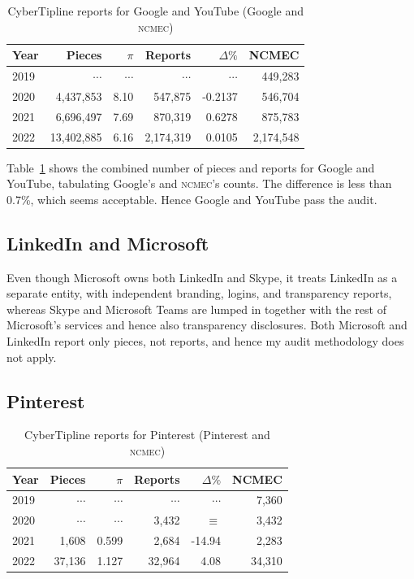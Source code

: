 \documentclass[nonacm,screen]{acmart}
\newcommand\V[1]{\textsc{\MakeLowercase{#1}}}
\begin{document}
\begin{table}[h!]
\centering\libertineLF
\caption{CyberTipline reports for Google and YouTube (Google and \V{NCMEC})}
\label{tab:alphabet}
\begin{tabular}{l|rr|rrr}
\textbf{Year}
& \textbf{Pieces} & \textbf{$\pi$} & \textbf{Reports}
& \textbf{$\Delta\%$} & \textbf{NCMEC} \\ \hline
2019 & $\cdots$ & $\cdots$ & $\cdots$ & $\cdots$ & 449,283 \\
2020 & 4,437,853 & 8.10 & 547,875 & -0.2137 & 546,704 \\
2021 & 6,696,497 & 7.69 & 870,319 & 0.6278 & 875,783 \\
2022 & 13,402,885 & 6.16 & 2,174,319 & 0.0105 & 2,174,548 \\
\end{tabular}
\end{table}

\noindent{}Table~\ref{tab:alphabet} shows the combined number of pieces and
reports for Google and YouTube, tabulating Google's and \V{NCMEC}'s counts. The
difference is less than 0.7\%, which seems acceptable. Hence Google and YouTube
pass the audit.


\subsection{LinkedIn and Microsoft}

\noindent{}Even though Microsoft owns both LinkedIn and Skype, it treats
LinkedIn as a separate entity, with independent branding, logins, and
transparency reports, whereas Skype and Microsoft Teams are lumped in together
with the rest of Microsoft's services and hence also transparency disclosures.
Both Microsoft and LinkedIn report only pieces, not reports, and hence my audit
methodology does not apply.


\subsection{Pinterest}

\begin{table}[h!]
\centering\libertineLF
\caption{CyberTipline reports for Pinterest (Pinterest and \V{NCMEC})}
\label{tab:pinterest}
\begin{tabular}{l|rr|rrr}
\textbf{Year}
& \textbf{Pieces} & \textbf{$\pi$} & \textbf{Reports}
& \textbf{$\Delta\%$} & \textbf{NCMEC} \\ \hline
2019 & $\cdots$ & $\cdots$ & $\cdots$ & $\cdots$ & 7,360 \\
2020 & $\cdots$ & $\cdots$ & 3,432 & $\equiv$ & 3,432 \\
2021 & 1,608 & 0.599 & 2,684 & -14.94 & 2,283 \\
2022 & 37,136 & 1.127 & 32,964 & 4.08 & 34,310 \\
\end{tabular}
\end{table}
\end{document}
